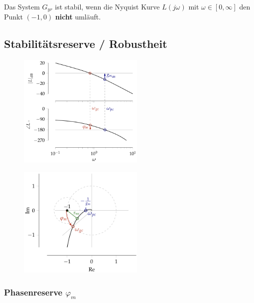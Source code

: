 \documentclass[
  10pt,
  a4paper,
]{article}
\numberwithin{equation}{section}
\begin{document}
\begin{multicols}{2}
Das System \(G_{yr}\) ist stabil, wenn die Nyquist Kurve \(L(j\omega)\)
mit \(\omega\in [0,\infty]\) den Punkt \((-1,0)\) \textbf{nicht}
umläuft.

\hypertarget{stabilituxe4tsreserve-robustheit}{%
\subsection{Stabilitätsreserve /
Robustheit}\label{stabilituxe4tsreserve-robustheit}}

\begin{figure}[H]

{\centering \includegraphics[width=6cm,height=\textheight]{images/paste-7.png}

}

\end{figure}

\begin{figure}[H]

{\centering \includegraphics[width=6cm,height=\textheight]{images/paste-8.png}

}

\end{figure}

\hypertarget{phasenreserve-varphi_m}{%
\subsubsection{\texorpdfstring{Phasenreserve
\(\varphi_m\)}{Phasenreserve \textbackslash varphi\_m}}\label{phasenreserve-varphi_m}}


\end{multicols}
\end{document}
